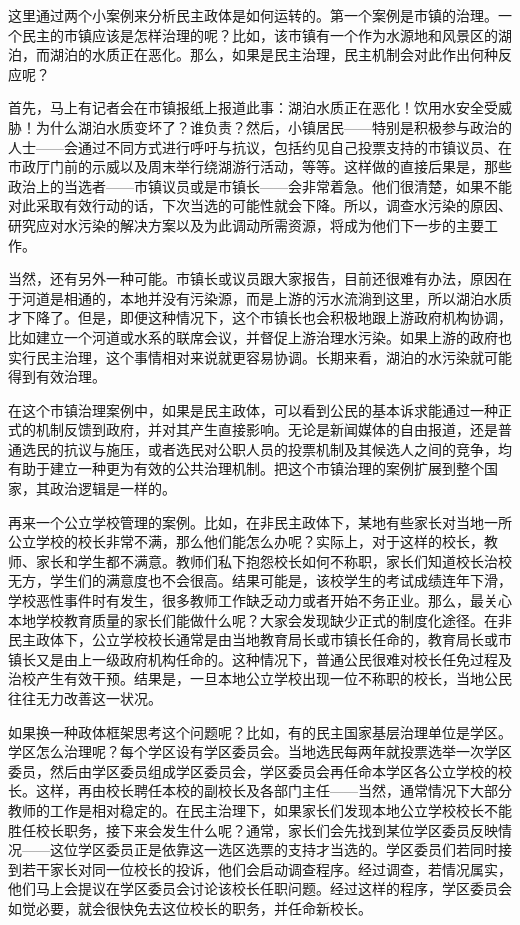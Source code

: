 
这里通过两个小案例来分析民主政体是如何运转的。第一个案例是市镇的治理。一个民主的市镇应该是怎样治理的呢？比如，该市镇有一个作为水源地和风景区的湖泊，而湖泊的水质正在恶化。那么，如果是民主治理，民主机制会对此作出何种反应呢？

首先，马上有记者会在市镇报纸上报道此事：湖泊水质正在恶化！饮用水安全受威胁！为什么湖泊水质变坏了？谁负责？然后，小镇居民——特别是积极参与政治的人士——会通过不同方式进行呼吁与抗议，包括约见自己投票支持的市镇议员、在市政厅门前的示威以及周末举行绕湖游行活动，等等。这样做的直接后果是，那些政治上的当选者——市镇议员或是市镇长——会非常着急。他们很清楚，如果不能对此采取有效行动的话，下次当选的可能性就会下降。所以，调查水污染的原因、研究应对水污染的解决方案以及为此调动所需资源，将成为他们下一步的主要工作。

当然，还有另外一种可能。市镇长或议员跟大家报告，目前还很难有办法，原因在于河道是相通的，本地并没有污染源，而是上游的污水流淌到这里，所以湖泊水质才下降了。但是，即便这种情况下，这个市镇长也会积极地跟上游政府机构协调，比如建立一个河道或水系的联席会议，并督促上游治理水污染。如果上游的政府也实行民主治理，这个事情相对来说就更容易协调。长期来看，湖泊的水污染就可能得到有效治理。

在这个市镇治理案例中，如果是民主政体，可以看到公民的基本诉求能通过一种正式的机制反馈到政府，并对其产生直接影响。无论是新闻媒体的自由报道，还是普通选民的抗议与施压，或者选民对公职人员的投票机制及其候选人之间的竞争，均有助于建立一种更为有效的公共治理机制。把这个市镇治理的案例扩展到整个国家，其政治逻辑是一样的。

再来一个公立学校管理的案例。比如，在非民主政体下，某地有些家长对当地一所公立学校的校长非常不满，那么他们能怎么办呢？实际上，对于这样的校长，教师、家长和学生都不满意。教师们私下抱怨校长如何不称职，家长们知道校长治校无方，学生们的满意度也不会很高。结果可能是，该校学生的考试成绩连年下滑，学校恶性事件时有发生，很多教师工作缺乏动力或者开始不务正业。那么，最关心本地学校教育质量的家长们能做什么呢？大家会发现缺少正式的制度化途径。在非民主政体下，公立学校校长通常是由当地教育局长或市镇长任命的，教育局长或市镇长又是由上一级政府机构任命的。这种情况下，普通公民很难对校长任免过程及治校产生有效干预。结果是，一旦本地公立学校出现一位不称职的校长，当地公民往往无力改善这一状况。

如果换一种政体框架思考这个问题呢？比如，有的民主国家基层治理单位是学区。学区怎么治理呢？每个学区设有学区委员会。当地选民每两年就投票选举一次学区委员，然后由学区委员组成学区委员会，学区委员会再任命本学区各公立学校的校长。这样，再由校长聘任本校的副校长及各部门主任——当然，通常情况下大部分教师的工作是相对稳定的。在民主治理下，如果家长们发现本地公立学校校长不能胜任校长职务，接下来会发生什么呢？通常，家长们会先找到某位学区委员反映情况——这位学区委员正是依靠这一选区选票的支持才当选的。学区委员们若同时接到若干家长对同一位校长的投诉，他们会启动调查程序。经过调查，若情况属实，他们马上会提议在学区委员会讨论该校长任职问题。经过这样的程序，学区委员会如觉必要，就会很快免去这位校长的职务，并任命新校长。

